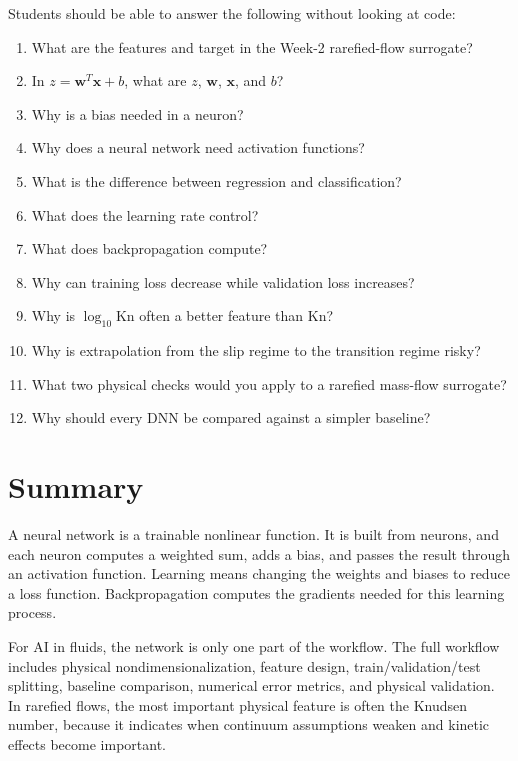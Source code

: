 \documentclass[11pt]{article}
\newcommand{\kn}{\mathrm{Kn}}
\newcommand{\bx}{\bm{x}}
\begin{document}
Students should be able to answer the following without looking at code:
\begin{enumerate}
    \item What are the features and target in the Week-2 rarefied-flow surrogate?
    \item In $z=\bm{w}^T\bx+b$, what are $z$, $\bm{w}$, $\bx$, and $b$?
    \item Why is a bias needed in a neuron?
    \item Why does a neural network need activation functions?
    \item What is the difference between regression and classification?
    \item What does the learning rate control?
    \item What does backpropagation compute?
    \item Why can training loss decrease while validation loss increases?
    \item Why is $\log_{10}\kn$ often a better feature than $\kn$?
    \item Why is extrapolation from the slip regime to the transition regime risky?
    \item What two physical checks would you apply to a rarefied mass-flow surrogate?
    \item Why should every DNN be compared against a simpler baseline?
\end{enumerate}

\section{Summary}

A neural network is a trainable nonlinear function.  It is built from neurons, and each neuron computes a weighted sum, adds a bias, and passes the result through an activation function.  Learning means changing the weights and biases to reduce a loss function.  Backpropagation computes the gradients needed for this learning process.

For AI in fluids, the network is only one part of the workflow.  The full workflow includes physical nondimensionalization, feature design, train/validation/test splitting, baseline comparison, numerical error metrics, and physical validation.  In rarefied flows, the most important physical feature is often the Knudsen number, because it indicates when continuum assumptions weaken and kinetic effects become important.
\end{document}
